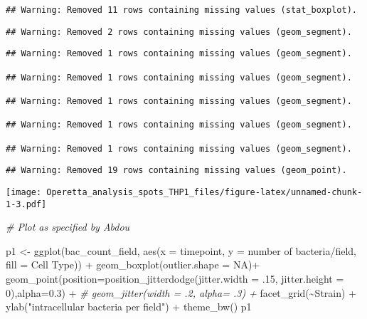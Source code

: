 \documentclass[
]{article}
\newenvironment{Shaded}{\begin{snugshade}}{\end{snugshade}}
\newcommand{\AttributeTok}[1]{\textcolor[rgb]{0.77,0.63,0.00}{#1}}
\newcommand{\CommentTok}[1]{\textcolor[rgb]{0.56,0.35,0.01}{\textit{#1}}}
\newcommand{\ConstantTok}[1]{\textcolor[rgb]{0.00,0.00,0.00}{#1}}
\newcommand{\DecValTok}[1]{\textcolor[rgb]{0.00,0.00,0.81}{#1}}
\newcommand{\FloatTok}[1]{\textcolor[rgb]{0.00,0.00,0.81}{#1}}
\newcommand{\FunctionTok}[1]{\textcolor[rgb]{0.00,0.00,0.00}{#1}}
\newcommand{\NormalTok}[1]{#1}
\newcommand{\OtherTok}[1]{\textcolor[rgb]{0.56,0.35,0.01}{#1}}
\newcommand{\SpecialCharTok}[1]{\textcolor[rgb]{0.00,0.00,0.00}{#1}}
\newcommand{\StringTok}[1]{\textcolor[rgb]{0.31,0.60,0.02}{#1}}
\begin{document}
\begin{verbatim}
## Warning: Removed 11 rows containing missing values (stat_boxplot).
\end{verbatim}

\begin{verbatim}
## Warning: Removed 2 rows containing missing values (geom_segment).
\end{verbatim}

\begin{verbatim}
## Warning: Removed 1 rows containing missing values (geom_segment).

## Warning: Removed 1 rows containing missing values (geom_segment).

## Warning: Removed 1 rows containing missing values (geom_segment).

## Warning: Removed 1 rows containing missing values (geom_segment).

## Warning: Removed 1 rows containing missing values (geom_segment).
\end{verbatim}

\begin{verbatim}
## Warning: Removed 19 rows containing missing values (geom_point).
\end{verbatim}

\texttt{[image: Operetta\_analysis\_spots\_THP1\_files/figure-latex/unnamed-chunk-1-3.pdf]}

\begin{Shaded}
\begin{Highlighting}[]
\CommentTok{\# Plot as specified by Abdou}


\NormalTok{p1 }\OtherTok{\textless{}{-}} \FunctionTok{ggplot}\NormalTok{(bac\_count\_field, }\FunctionTok{aes}\NormalTok{(}\AttributeTok{x =}\NormalTok{ timepoint, }\AttributeTok{y =} \StringTok{\textasciigrave{}}\AttributeTok{number of bacteria/field}\StringTok{\textasciigrave{}}\NormalTok{, }\AttributeTok{fill =} \StringTok{\textasciigrave{}}\AttributeTok{Cell Type}\StringTok{\textasciigrave{}}\NormalTok{)) }\SpecialCharTok{+}
  \FunctionTok{geom\_boxplot}\NormalTok{(}\AttributeTok{outlier.shape =} \ConstantTok{NA}\NormalTok{)}\SpecialCharTok{+}
  \FunctionTok{geom\_point}\NormalTok{(}\AttributeTok{position=}\FunctionTok{position\_jitterdodge}\NormalTok{(}\AttributeTok{jitter.width =}\NormalTok{ .}\DecValTok{15}\NormalTok{, }\AttributeTok{jitter.height =} \DecValTok{0}\NormalTok{),}\AttributeTok{alpha=}\FloatTok{0.3}\NormalTok{) }\SpecialCharTok{+}
  \CommentTok{\#  geom\_jitter(width = .2, alpha= .3) +}
  \FunctionTok{facet\_grid}\NormalTok{(}\SpecialCharTok{\textasciitilde{}}\NormalTok{Strain) }\SpecialCharTok{+}
  \FunctionTok{ylab}\NormalTok{(}\StringTok{"intracellular bacteria per field"}\NormalTok{) }\SpecialCharTok{+}
  \FunctionTok{theme\_bw}\NormalTok{()}
\NormalTok{p1}
\end{Highlighting}
\end{Shaded}
\end{document}
